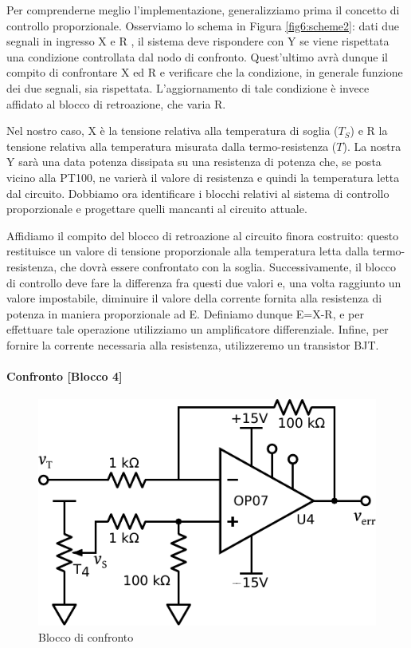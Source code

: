 Per comprenderne meglio l'implementazione, generalizziamo prima il concetto di controllo proporzionale.
Osserviamo lo schema in Figura \ref{fig6:scheme2}: dati due segnali in ingresso X e R , il sistema deve rispondere con Y  se viene rispettata una condizione controllata dal nodo di confronto.
Quest'ultimo avrà dunque il compito di confrontare X ed R e verificare che la condizione, in generale funzione dei due segnali, sia rispettata.
L'aggiornamento di tale condizione è invece affidato al blocco di retroazione, che varia R.

Nel nostro caso, X è la tensione relativa alla temperatura di soglia ($T_{S}$) e R la tensione relativa alla temperatura misurata dalla termo-resistenza ($T$).
La nostra Y sarà una data potenza dissipata su una resistenza di potenza che, se posta vicino alla PT100, ne varierà il valore di resistenza e quindi la temperatura letta dal circuito.
Dobbiamo ora identificare i blocchi relativi al sistema di controllo proporzionale e progettare quelli mancanti al circuito attuale.

Affidiamo il compito del blocco di retroazione al circuito finora costruito: questo restituisce un valore di tensione proporzionale alla temperatura letta dalla termo-resistenza, che dovrà essere confrontato con la soglia.
Successivamente, il blocco di controllo deve fare la differenza fra questi due valori e, una volta raggiunto un valore impostabile, diminuire il valore della corrente fornita alla resistenza di potenza in maniera proporzionale ad E.
Definiamo dunque E=X-R, e per effettuare tale operazione utilizziamo un amplificatore differenziale.
Infine, per fornire la corrente necessaria alla resistenza, utilizzeremo un transistor BJT.

\paragraph{Confronto [Blocco 4]\newline}

\begin{figure}
\centering
\includegraphics[width=.33\textwidth]{../E06/latex/P4.pdf}
\caption{Blocco di confronto}
\label{fig6:blocco4}
\end{figure}

